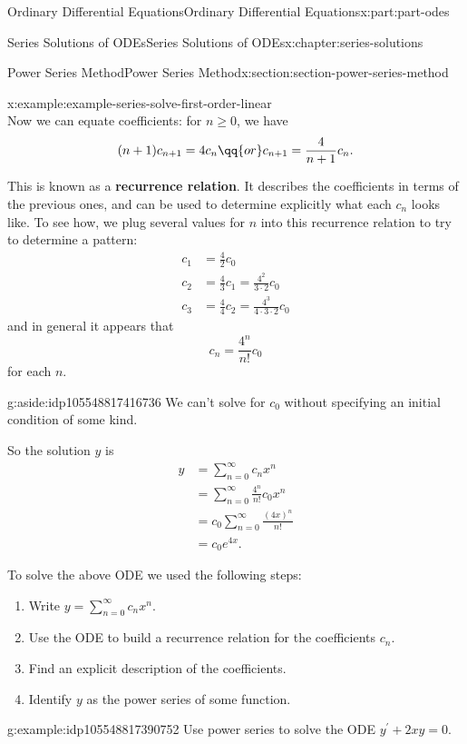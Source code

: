 \documentclass[twoside,10pt,]{book}
\newcommand{\terminology}[1]{\textbf{#1}}
\numberwithin{equation}{part}
\newcommand{\amp}{&}
\begin{document}
\begin{partptx}{Ordinary Differential Equations}{}{Ordinary Differential Equations}{}{}{x:part:part-odes}
\begin{chapterptx}{Series Solutions of ODEs}{}{Series Solutions of ODEs}{}{}{x:chapter:series-solutions}
\begin{sectionptx}{Power Series Method}{}{Power Series Method}{}{}{x:section:section-power-series-method}
\begin{example}{}{x:example:example-series-solve-first-order-linear}
\begin{equation*}
\end{equation*}
Now we can equate coefficients: for \(n\geq0\), we have%
\begin{equation*}
(n+1)c_{n+1} = 4c_{n}\qq{or} c_{n+1} = \frac{4}{n+1}c_{n}.
\end{equation*}
%
\par
This is known as a \terminology{recurrence relation}. It describes the coefficients in terms of the previous ones, and can be used to determine explicitly what each \(c_{n}\) looks like. To see how, we plug several values for \(n\) into this recurrence relation to try to determine a pattern:%
\begin{align*}
c_{1} \amp= \frac{4}{2}c_{0}\\
c_{2} \amp= \frac{4}{3}c_{1} = \frac{4^{2}}{3\cdot2}c_{0}\\
c_{3} \amp= \frac{4}{4}c_{2} = \frac{4^{3}}{4\cdot3\cdot2}c_{0}
\end{align*}
and in general it appears that%
\begin{equation*}
c_{n} = \frac{4^{n}}{n!}c_{0}
\end{equation*}
for each \(n\). \begin{aside}{}{g:aside:idp105548817416736}%
We can't solve for \(c_{0}\) without specifying an initial condition of some kind.%
\end{aside}
 So the solution \(y\) is%
\begin{align*}
y \amp= \sum_{n=0}^{\infty}c_{n}x^{n}\\
\amp= \sum_{n=0}^{\infty}\frac{4^{n}}{n!}c_{0}x^{n}\\
\amp= c_{0}\sum_{n=0}^{\infty}\frac{(4x)^{n}}{n!}\\
\amp= c_{0}e^{4x}\text{.}
\end{align*}
%
\end{example}
To solve the above ODE we used the following steps:%
\begin{enumerate}
\item{}Write \(y = \sum_{n=0}^{\infty}c_{n}x^{n}\).%
\item{}Use the ODE to build a recurrence relation for the coefficients \(c_{n}\).%
\item{}Find an explicit description of the coefficients.%
\item{}Identify \(y\) as the power series of some function.%
\end{enumerate}
%
\begin{example}{}{g:example:idp105548817390752}%
Use power series to solve the ODE \(y^\prime+2xy=0\).%
\par\smallskip%

\end{example}
\end{sectionptx}
\end{chapterptx}
\end{partptx}
\end{document}
